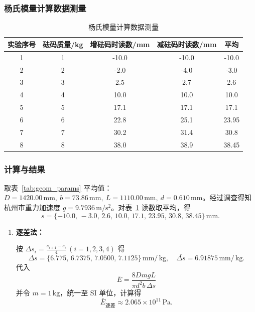 \documentclass[]{../template/Report}%
\begin{document}
\begin{fullreportonly}
    \subsubsection{杨氏模量计算数据测量}
    \begin{table}[H]
        \centering
        \caption{杨氏模量计算数据测量}
        \label{tab:load_readings}
        \small
        \begin{tabular}{|c|c|c|c|c|}
            \hline
            实验序号 & 砝码质量/kg & 增砝码时读数/mm & 减砝码时读数/mm & 平均    \\
            \hline
            1    & 1       & -10.0     & -10.0     & -10.0 \\
            2    & 2       & -2.0      & -4.0      & -3.0  \\
            3    & 3       & 2.5       & 2.7       & 2.6   \\
            4    & 4       & 10.0      & 10.0      & 10.0  \\
            5    & 5       & 17.1      & 17.1      & 17.1  \\
            6    & 6       & 22.8      & 25.1      & 23.95 \\
            7    & 7       & 30.2      & 31.4      & 30.8  \\
            8    & 8       & 38.0      & 38.9      & 38.45 \\
            \hline
        \end{tabular}
    \end{table}

    \subsubsection{计算与结果}
    取表~\ref{tab:geom_params} 平均值：\(D=1420.00\,\mathrm{mm},\ b=73.86\,\mathrm{mm},\ L=1110.00\,\mathrm{mm},\ d=0.610\,\mathrm{mm}\)。经过调查得知杭州市重力加速度 \(g=9.7936\,\mathrm{m/s^2}\)。对表~\ref{tab:load_readings} 读数取平均，得
    \[s=\{-10.0,\,-3.0,\,2.6,\,10.0,\,17.1,\,23.95,\,30.8,\,38.45\}\,\mathrm{mm} .\]

    \begin{enumerate}[label=(\arabic*)]
        \item \textbf{逐差法：}

              按 \(\Delta s_i=\frac{s_{i+4}-s_i}{4}\,(i=1,2,3,4)\) 得
              \[\Delta s=\{6.775,\,6.7375,\,7.0500,\,7.1125\}\,\mathrm{mm/\,kg},\quad \overline{\Delta s}=6.91875\,\mathrm{mm/\,kg}.\]
              代入
              \[\bar{E}=\frac{8DmgL}{\pi d^2 b\,\Delta s}\]
              并令 \(m=1\,\mathrm{kg}\)，统一至 SI 单位，计算得
              \[\boxed{\bar{E}_{\text{逐差}}\approx 2.065\times10^{11}\,\mathrm{Pa} }.\]


\end{enumerate}
\end{fullreportonly}
\end{document}
